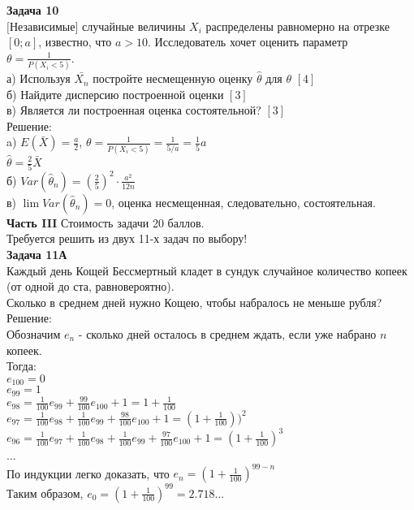 \documentclass[pdftex,12pt,a4paper]{article}
\begin{document}
\textbf{Задача 10} \\ %
$[$Независимые$]$ случайные величины $X_{i}$ распределены
равномерно на отрезке $[0;a]$, известно, что $a>10$. Исследователь
хочет оценить
параметр $\theta=\frac{1}{P(X_{i}<5)}$. \\
а) Используя $\bar{X_{n}}$ постройте несмещенную оценку
$\hat{\theta}$ для $\theta$ $[4]$\\
б) Найдите дисперсию построенной оценки $[3]$\\
в) Является ли построенная оценка состоятельной? $[3]$\\
Решение: \\
a) $E(\bar{X})=\frac{a}{2}$,
$\theta=\frac{1}{P(X_{i}<5)}=\frac{1}{5/a}=\frac{1}{5}a$ \\
$\hat{\theta}=\frac{2}{5}\bar{X}$ \\
б) $Var(\hat{\theta}_{n})=(\frac{2}{5})^{2}\cdot\frac{a^{2}}{12n}$ \\
в) $\lim Var(\hat{\theta}_{n})=0$, оценка несмещенная,
следовательно, состоятельная. \\

\newpage
\textbf{Часть III} Стоимость задачи 20 баллов. \\

Требуется решить \textbf{} из двух 11-х задач по
выбору! \\


\textbf{Задача 11А} \\
Каждый день Кощей Бессмертный кладет в сундук случайное количество
копеек (от одной до ста, равновероятно). \\
Сколько в среднем дней нужно Кощею, чтобы набралось не меньше рубля? \\
Решение: \\
Обозначим $e_{n}$ - сколько дней осталось в среднем ждать, если
уже набрано $n$ копеек. \\
Тогда: \\
$e_{100}=0$ \\
$e_{99}=1$ \\
$e_{98}=\frac{1}{100}e_{99}+\frac{99}{100}e_{100}+1=1+\frac{1}{100}$\\
$e_{97}=\frac{1}{100}e_{98}+\frac{1}{100}e_{99}+\frac{98}{100}e_{100}+1=(1+\frac{1}{100}))^{2}$
\\
$e_{96}=\frac{1}{100}e_{97}+\frac{1}{100}e_{98}+\frac{1}{100}e_{99}+\frac{97}{100}e_{100}+1=(1+\frac{1}{100})^{3}$
\\
... \\
По индукции легко доказать, что $e_{n}=(1+\frac{1}{100})^{99-n}$ \\
Таким образом, $e_{0}=(1+\frac{1}{100})^{99}=2.718...$ \\
\end{document}
